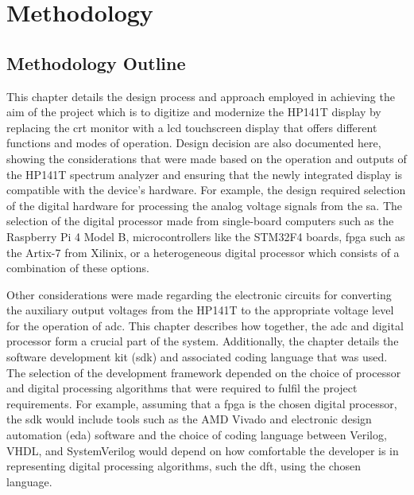 \documentclass[class=report,11pt,crop=false]{standalone}
\begin{document}
	\chapter{Methodology \label{ch:meth}}
	
	\section{Methodology Outline}
	
	This chapter details the design process and approach employed in achieving the aim of the project which is to  digitize and modernize the HP141T display by replacing the \acrshort{crt} monitor with a \acrshort{lcd} touchscreen display that offers different functions and modes of operation. Design decision are also documented here, showing the considerations that were made based on the operation and outputs of the HP141T spectrum analyzer and ensuring that the newly integrated display is compatible with the device's hardware. For example, the design required selection of the digital hardware for processing the analog voltage signals from the \acrshort{sa}. The selection of the digital processor made from single-board computers such as the Raspberry Pi 4 Model B, microcontrollers like the STM32F4 boards, \acrshort{fpga} such as the Artix-7 from Xilinix, or a heterogeneous digital processor which consists of a combination of these options. 
	
	Other considerations were made regarding the electronic circuits for converting the auxiliary output voltages from the HP141T to the appropriate voltage level for the operation of \acrshort{adc}. This chapter describes how together, the \acrshort{adc} and digital processor form a crucial part of the system. Additionally, the chapter details the software development kit (\acrshort{sdk}) and associated coding language that was used. The selection of the development framework depended on the choice of processor and digital processing algorithms that were required to fulfil the project requirements. For example, assuming that a \acrshort{fpga} is the chosen digital processor, the  \acrshort{sdk} would include tools such as the AMD Vivado and electronic design automation (\acrshort{eda}) software and the choice of coding language between Verilog, VHDL, and SystemVerilog would depend on how comfortable the developer is in representing digital processing algorithms, such the \acrshort{dft}, using the chosen language. 
	
\end{document}
